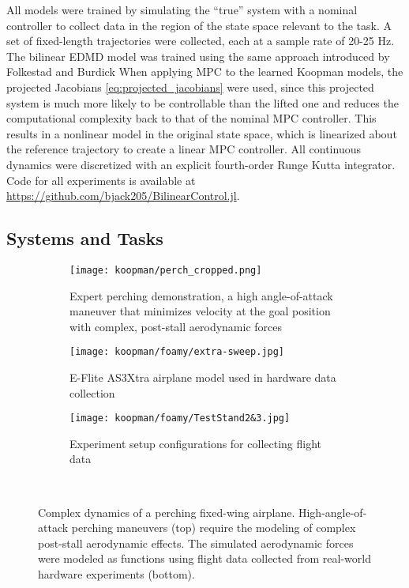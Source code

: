 \documentclass[../root.tex]{subfiles}
\newcommand{\changed}[1]{{\color{black} #1}}
\begin{document}
All models were trained by simulating the ``true'' system with a nominal
controller to collect data in the region of the state space relevant to the
task. A set of fixed-length trajectories were collected, each at a sample rate
of 20-25 Hz. The bilinear EDMD model was trained using the same approach
introduced by Folkestad and Burdick \cite{folkestad_Koopman_2021} \changed{When
applying MPC to the learned Koopman models, the projected Jacobians 
\eqref{eq:projected_jacobians} were used, since this projected system is much
more likely to be controllable than the lifted one and reduces the computational
complexity back to that of the nominal MPC controller. This results in a
nonlinear model in the original state space, which is linearized about the
reference trajectory to create a linear MPC controller.} All continuous dynamics
were discretized with an explicit fourth-order Runge Kutta integrator. Code for
all experiments is available at \url{https://github.com/bjack205/BilinearControl.jl}.

\subsection{Systems and Tasks}

\begin{figure}
    \begin{subfigure}{\linewidth}
        \centering
        \texttt{[image: koopman/perch\_cropped.png]}
        \caption{Expert perching demonstration, a high angle-of-attack maneuver that minimizes 
                velocity at the goal position with complex, post-stall aerodynamic forces}
        \label{fig:perch}
    \end{subfigure}
    \par\medskip
    \begin{subfigure}{.4\linewidth}
        \centering
        \texttt{[image: koopman/foamy/extra-sweep.jpg]}
        \caption{E-Flite AS3Xtra airplane model used in hardware data collection}
        \label{fig:hw1}
    \end{subfigure}%
    \hfill
    \begin{subfigure}{.52\linewidth}
        \centering
        \texttt{[image: koopman/foamy/TestStand2\&3.jpg]}
        \caption{Experiment setup configurations for collecting flight data}
        \label{fig:hw2}
    \end{subfigure}\\[1ex]
    \caption{\changed{Complex dynamics of a perching fixed-wing airplane. High-angle-of-attack perching maneuvers (top) require the modeling of complex post-stall aerodynamic effects. The simulated aerodynamic forces were modeled as functions using flight data collected from real-world hardware experiments (bottom).}}
    \label{fig:test}
\end{figure}
\end{document}
